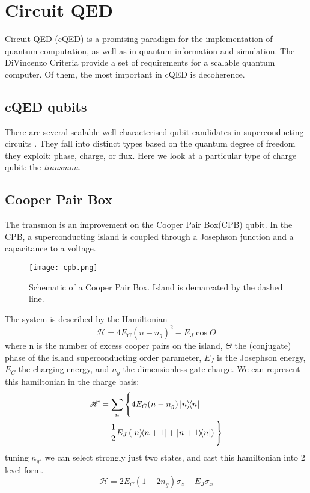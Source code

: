\section{Circuit QED}
Circuit QED (cQED) is a promising paradigm for the implementation of quantum computation, as well as in quantum information and simulation.
The DiVincenzo Criteria \cite{DiVincenzo} provide a set of requirements for a scalable quantum computer. 
Of them, the most important in cQED is decoherence. 
\subsection{cQED qubits}
There are several scalable well-characterised qubit candidates in superconducting circuits \cite{Makhlin2001}.
They fall into distinct types based on the quantum degree of freedom they exploit: phase, charge, or flux.
Here we look at a particular type of charge qubit: the \emph{transmon}.
\subsection{Cooper Pair Box}
The transmon is an improvement on the Cooper Pair Box(CPB) qubit.
In the CPB, a superconducting island is coupled through a Josephson junction and a capacitance to a voltage.
\begin{figure}[t]
  \texttt{[image: cpb.png]}
  \caption{Schematic of a Cooper Pair Box. Island is demarcated by the dashed line.}
\end{figure}
The system is described by the Hamiltonian \cite{Makhlin2001}
\begin{equation}
  \mathscr{H} = 4E_C(n-n_g)^2 - E_J \cos \Theta
\end{equation}
where n is the number of excess cooper pairs on the island, $\Theta$ the (conjugate) phase of the island superconducting order parameter, $E_J$ is the Josephson energy, $E_C$ the charging energy, and $n_g$ the dimensionless gate charge.
We can represent this hamiltonian in the charge basis:
\begin{align}
  \mathscr{H} &= \sum_n \Bigg\{ 4 E_C (n-n_g) \ketbra{n}{n}\\ 
              &- \frac{1}{2} E_J \left( \ketbra{n}{n+1} 
                                       + \ketbra{n+1}{n} \right) \Bigg\}
\end{align}
tuning $n_g$, we can select strongly just two states, and cast this hamiltonian into 2 level form.
\begin{equation}
  \mathscr{H} = 2E_C ( 1-2n_g ) \sigma_z - E_J \sigma_x 
\end{equation}
